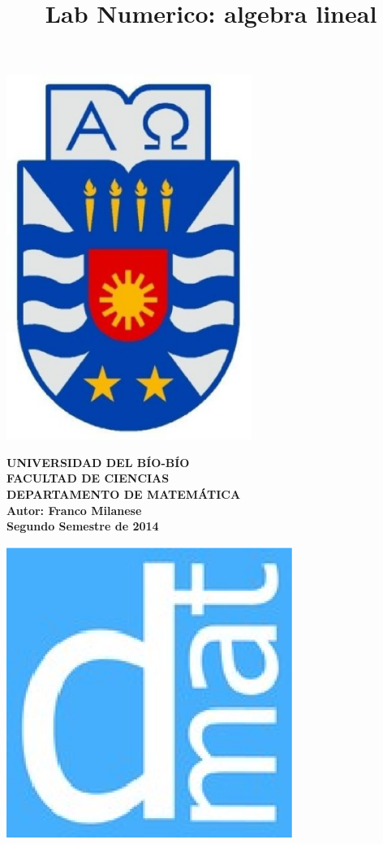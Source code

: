 \documentclass[12pt,letterpaper]{article}
\begin{document}
\title{Lab Numerico: algebra lineal}
{\begin{minipage}{2cm}
\hspace*{1cm}\includegraphics[width=0.6\textwidth]{escubo-ubb.eps}
\end{minipage}
\begin{minipage}{12cm}
\small
{\bf \rm
{\hspace*{3.1cm} {\footnotesize UNIVERSIDAD DEL B\'IO-B\'IO} \\
 \hspace*{3.7cm} {\scriptsize FACULTAD DE CIENCIAS}  \\
  \hspace*{2.9cm} {\scriptsize DEPARTAMENTO DE MATEM\'ATICA}  \\
\hspace*{3.75cm} {\scriptsize Autor: Franco Milanese}\\
\hspace*{3.75cm} {\scriptsize Segundo Semestre de 2014}}}
\end{minipage}}
{\begin{minipage}{2cm}
\hspace*{-0.5cm}\vspace*{-0.05cm}\includegraphics[width=0.7\textwidth]{escudo-dmat.eps}
\end{minipage}}
\end{document}
